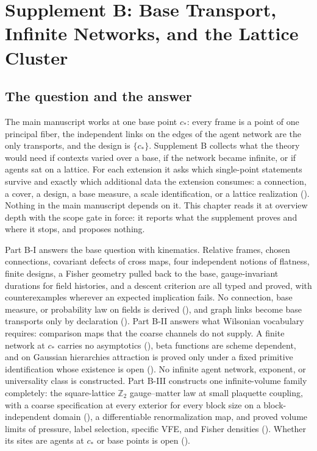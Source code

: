 \chapter{Supplement B: Base Transport, Infinite Networks, and the Lattice Cluster}
\label{comp:sb}

\section{The question and the answer}
\label{comp:sb-question}

The main manuscript works at one base point \(c_*\): every frame is a point of one principal fiber,
the independent links on the edges of the agent network are the only transports, and the design is
\(\{c_*\}\). Supplement B collects what the theory would need if contexts varied over a base, if the
network became infinite, or if agents sat on a lattice. For each extension it asks which single-point
statements survive and exactly which additional data the extension consumes: a connection, a cover, a
design, a base measure, a scale identification, or a lattice realization ().
Nothing in the main manuscript depends on it. This chapter reads it at overview depth with the scope
gate in force: it reports what the supplement proves and where it stops, and proposes nothing.

Part B-I answers the base question with kinematics. Relative frames, chosen connections, covariant
defects of cross maps, four independent notions of flatness, finite designs, a Fisher geometry pulled
back to the base, gauge-invariant durations for field histories, and a descent criterion are all
typed and proved, with counterexamples wherever an expected implication fails. No connection, base measure, or probability
law on fields is derived (), and graph links become base transports
only by declaration (). Part B-II answers what Wilsonian vocabulary
requires: comparison maps that the coarse channels do not supply. A finite network at \(c_*\) carries
no asymptotics (), beta functions are scheme dependent, and on
Gaussian hierarchies attraction is proved only under a fixed primitive identification whose existence
is open (). No infinite agent network, exponent, or universality class
is constructed. Part B-III constructs one infinite-volume family completely: the square-lattice
\(\mathbb Z_2\) gauge--matter law at small plaquette coupling, with a coarse specification at every
exterior for every block size on a block-independent domain
(), a differentiable renormalization map, and proved
volume limits of pressure, label selection, specific VFE, and Fisher densities
(). Whether its sites are agents at \(c_*\) or base points is
open ().

